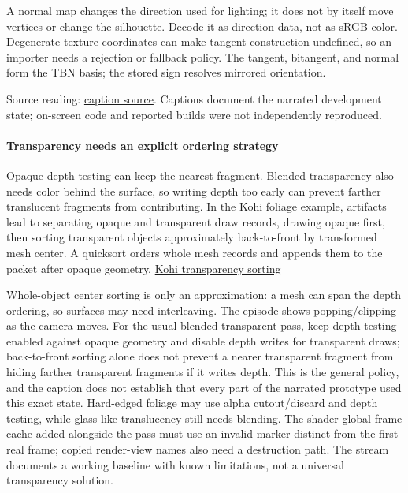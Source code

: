 A normal map changes the direction used for lighting; it does not by itself move vertices or change the silhouette. Decode it as direction data, not as sRGB color. Degenerate texture coordinates can make tangent construction undefined, so an importer needs a rejection or fallback policy. The tangent, bitangent, and normal form the TBN basis; the stored sign resolves mirrored orientation.

Source reading: \href{https://www.youtube.com/watch?v=I0259XQnKng}{caption source}. Captions document the narrated development state; on-screen code and reported builds were not independently reproduced.

\paragraph{Transparency needs an explicit ordering strategy}\label{transparency-needs-an-explicit-ordering-strategy}

Opaque depth testing can keep the nearest fragment. Blended transparency also needs color behind the surface, so writing depth too early can prevent farther translucent fragments from contributing. In the Kohi foliage example, artifacts lead to separating opaque and transparent draw records, drawing opaque first, then sorting transparent objects approximately back-to-front by transformed mesh center. A quicksort orders whole mesh records and appends them to the packet after opaque geometry. \href{https://www.youtube.com/watch?v=duQSUgdrBk0}{Kohi transparency sorting}

Whole-object center sorting is only an approximation: a mesh can span the depth ordering, so surfaces may need interleaving. The episode shows popping/clipping as the camera moves. For the usual blended-transparent pass, keep depth testing enabled against opaque geometry and disable depth writes for transparent draws; back-to-front sorting alone does not prevent a nearer transparent fragment from hiding farther transparent fragments if it writes depth. This is the general policy, and the caption does not establish that every part of the narrated prototype used this exact state. Hard-edged foliage may use alpha cutout/discard and depth testing, while glass-like translucency still needs blending. The shader-global frame cache added alongside the pass must use an invalid marker distinct from the first real frame; copied render-view names also need a destruction path. The stream documents a working baseline with known limitations, not a universal transparency solution.

